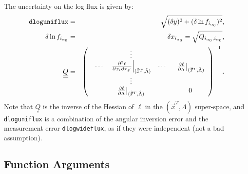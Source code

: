\documentclass{article}    %
\newcommand{\dbul}[1]{\underline{\underline{#1}}}
\begin{document}
The uncertainty on the log flux is given by:
\begin{eqnarray}
\verb|dloguniflux| &=& 
\sqrt{(\delta y)^2 + (\delta \ln f_{i_{\alpha_0}} )^2}, \\
\delta\ln f_{i_{\alpha_0}} &=& \delta x_{i_{\alpha_0}} =
\sqrt{Q_{i_{\alpha_0},i_{\alpha_0}}}, 
\\
\dbul{Q} &=& \left(
  \begin{array}{cc}
  \begin{array}{ccc}
    ~ & \vdots & ~ \\
    \cdots & \left.
      \frac{\partial^2 \ell}{\partial x_i \partial x_{i'}}\right|_{(\hat{\vec{x}}^T,\hat{\Lambda})}
    & \cdots \\
    ~ & \vdots & ~ 
  \end{array} & \left.\frac{\partial \ell}{\partial \Lambda}\right|_{(\hat{\vec{x}}^T,\hat{\Lambda})} \\
  \left.\frac{\partial \ell}{\partial \Lambda}\right|_{(\hat{\vec{x}}^T,\hat{\Lambda})} & 0
  \end{array}
\right)^{-1}.
\end{eqnarray}
Note that $\dbul{Q}$ is the inverse of the Hessian of $\ell$ in the
$(\vec{x}^T,\Lambda)$ super-space, and \verb|dloguniflux| is a
combination of the angular inversion error and the measurement error
\verb|dlogwideflux|, as if they were independent (not a bad
assumption).

\subsection{Function Arguments}
\end{document}
